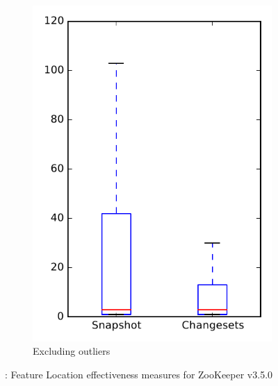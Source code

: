 \begin{figure}
\begin{subfigure}{.4\textwidth}
        \includegraphics[height=0.4\textheight]{figures/flt/rq1_zookeeper_no_outlier}
        \caption{Excluding outliers}\label{fig:flt:rq1:zookeeper_no_outlier}
    \end{subfigure}
\caption{\fone: Feature Location effectiveness measures for ZooKeeper v3.5.0}
\label{fig:flt:rq1:zookeeper}
\end{figure}
